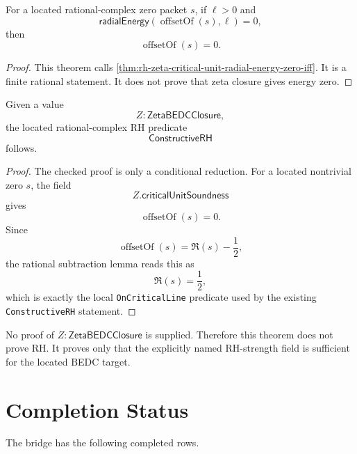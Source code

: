 \begin{theorem}
\label{thm:rh-zeta-critical-unit-offset-zero-of-energy-zero}
For a located rational-complex zero packet $s$, if $\ell>0$ and
$$
\mathsf{radialEnergy}(\operatorname{offsetOf}(s),\ell)=0,
$$
then
$$
\operatorname{offsetOf}(s)=0.
$$
\end{theorem}

\begin{proof}
This theorem calls
\autoref{thm:rh-zeta-critical-unit-radial-energy-zero-iff}. It is a
finite rational statement. It does not prove that zeta closure gives
energy zero.
\end{proof}

\begin{theorem}
\label{thm:rh-zeta-critical-unit-closure-implies-constructive-rh}
Given a value
$$
Z:\mathsf{ZetaBEDCClosure},
$$
the located rational-complex RH predicate
$$
\mathsf{ConstructiveRH}
$$
follows.
\end{theorem}

\begin{proof}
The checked proof is only a conditional reduction. For a located
nontrivial zero $s$, the field
$$
Z.\mathsf{criticalUnitSoundness}
$$
gives
$$
\operatorname{offsetOf}(s)=0.
$$
Since
$$
\operatorname{offsetOf}(s)=\Re(s)-\frac12,
$$
the rational subtraction lemma reads this as
$$
\Re(s)=\frac12,
$$
which is exactly the local \texttt{OnCriticalLine} predicate used by the
existing \texttt{ConstructiveRH} statement.
\end{proof}

No proof of $Z:\mathsf{ZetaBEDCClosure}$ is supplied. Therefore this
theorem does not prove RH. It proves only that the explicitly named
RH-strength field is sufficient for the located BEDC target.

\section{Completion Status}
\label{sec:rh-zeta-critical-unit-completion-status}

The bridge has the following completed rows.

